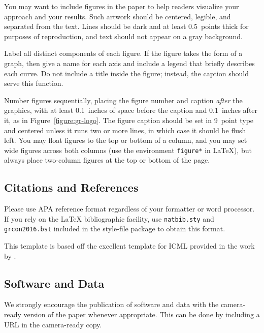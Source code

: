 \documentclass{article}
\begin{document}
You may want to include figures in the paper to help readers visualize
your approach and your results. Such artwork should be centered,
legible, and separated from the text. Lines should be dark and at
least 0.5~points thick for purposes of reproduction, and text should
not appear on a gray background.

Label all distinct components of each figure. If the figure takes the
form of a graph, then give a name for each axis and include a legend
that briefly describes each curve. Do not include a title inside the
figure; instead, the caption should serve this function.

Number figures sequentially, placing the figure number and caption
{\it after\/} the graphics, with at least 0.1~inches of space before
the caption and 0.1~inches after it, as in
Figure~\ref{figure:gr-logo}.  The figure caption should be set in
9~point type and centered unless it runs two or more lines, in which
case it should be flush left.  You may float figures to the top or
bottom of a column, and you may set wide figures across both columns
(use the environment {\tt figure*} in \LaTeX), but always place
two-column figures at the top or bottom of the page.


\subsection{Citations and References} 

Please use APA reference format regardless of your formatter
or word processor. If you rely on the \LaTeX\/ bibliographic 
facility, use {\tt natbib.sty} and {\tt grcon2016.bst} 
included in the style-file package to obtain this format.

This template is based off the excellent template for ICML provided
in the work by \cite{langley00}.

\subsection{Software and Data}

We strongly encourage the publication of software and data with the
camera-ready version of the paper whenever appropriate.  This can be
done by including a URL in the camera-ready copy.  






\thebibliography
\end{document}
